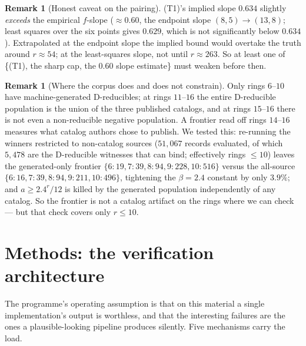 \documentclass[11pt]{article}
\theoremstyle{definition}
\newtheorem{remark}[theorem]{Remark}
\begin{document}
\begin{remark}[Honest caveat on the pairing]
(T1)'s implied slope $0.634$ slightly \emph{exceeds} the empirical $f$-slope
($\approx 0.60$, the endpoint slope $(8{,}5)\to(13{,}8)$; least squares over the six
points gives $0.629$, which is not significantly below $0.634$). Extrapolated at the
endpoint slope the implied bound would overtake the truth around $r\approx 54$; at
the least-squares slope, not until $r\approx 263$. So at least one of \{(T1), the
sharp cap, the $0.60$ slope
estimate\} must weaken before then.
\end{remark}

\begin{remark}[Where the corpus does and does not constrain]
Only rings $6$--$10$ have machine-generated D-reducibles; at rings $11$--$16$ the
entire D-reducible population is the union of the three published catalogs, and at
rings $15$--$16$ there is not even a non-reducible negative population. A frontier
read off rings $14$--$16$ measures what catalog authors chose to publish. We tested
this: re-running the winners restricted to non-catalog sources ($51{,}067$ records
evaluated, of which $5{,}478$ are the D-reducible witnesses that can bind;
effectively rings $\le10$) leaves the generated-only frontier
$\{6{:}19, 7{:}39, 8{:}94, 9{:}228, 10{:}516\}$ versus the all-source
$\{6{:}16, 7{:}39, 8{:}94, 9{:}211, 10{:}496\}$, tightening the $\beta=2.4$ constant
by only $3.9\%$; and $a \ge 2.4^r/12$ is killed by the generated population
independently of any catalog. So the frontier is not a catalog artifact on the rings
where we can check --- but that check covers only $r\le10$.
\end{remark}

\section{Methods: the verification architecture}
\label{sec:methods}

The programme's operating assumption is that on this material a single
implementation's output is worthless, and that the interesting failures are the ones
a plausible-looking pipeline produces silently. Five mechanisms carry the load.
\end{document}
